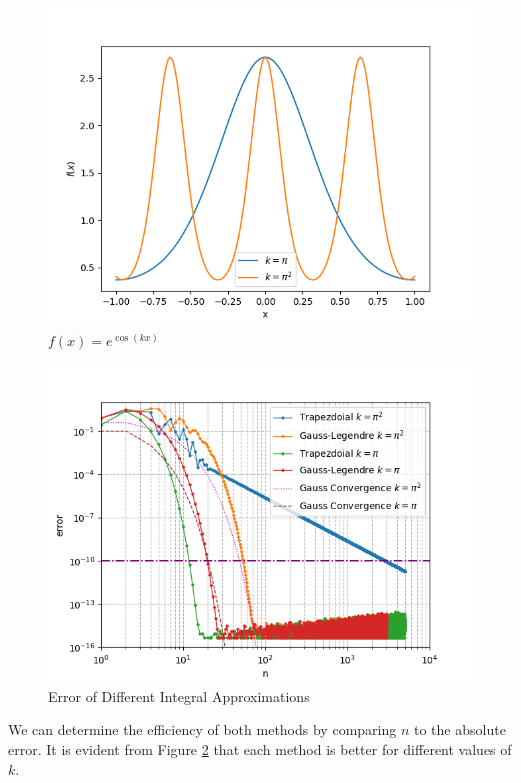 \documentclass[12pt]{article}
\begin{document}
\begin{figure}
  \centering
  \includegraphics{../figures/functions_plot.png}
  \caption{\(f(x) = e^{\cos{(k x)}}\)}
  \label{fig:function_plot}
\end{figure}

\begin{figure}
  \centering
  \includegraphics{../figures/graph}
  \caption{Error of Different Integral Approximations}
  \label{fig:graph}
\end{figure}

We can determine the efficiency of both methods by comparing \(n\) to the absolute error. 
It is evident from Figure \ref{fig:graph} that each method is better for different values of \(k\).
\end{document}
